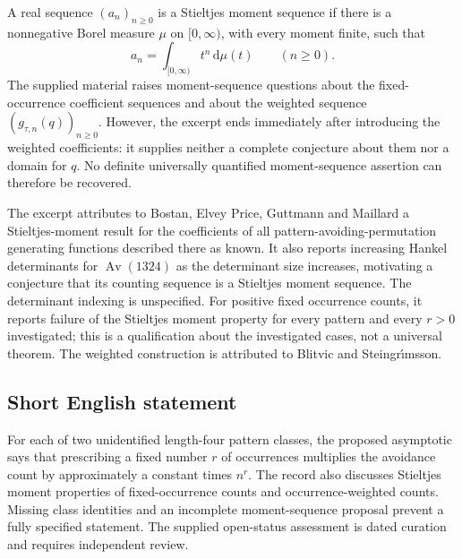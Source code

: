 \documentclass[11pt]{article}
\begin{document}
A real sequence \((a_n)_{n\ge0}\) is a Stieltjes moment sequence if there is a nonnegative Borel measure \(\mu\) on \([0,\infty)\), with every moment finite, such that
\[
a_n=\int_{[0,\infty)}t^n\,\mathrm{d}\mu(t)\qquad(n\ge0).
\]
The supplied material raises moment-sequence questions about the fixed-occurrence coefficient sequences and about the weighted sequence \((g_{\tau,n}(q))_{n\ge0}\). However, the excerpt ends immediately after introducing the weighted coefficients: it supplies neither a complete conjecture about them nor a domain for \(q\). No definite universally quantified moment-sequence assertion can therefore be recovered.

The excerpt attributes to Bostan, Elvey Price, Guttmann and Maillard a Stieltjes-moment result for the coefficients of all pattern-avoiding-permutation generating functions described there as known. It also reports increasing Hankel determinants for \(\operatorname{Av}(1324)\) as the determinant size increases, motivating a conjecture that its counting sequence is a Stieltjes moment sequence. The determinant indexing is unspecified. For positive fixed occurrence counts, it reports failure of the Stieltjes moment property for every pattern and every \(r>0\) investigated; this is a qualification about the investigated cases, not a universal theorem. The weighted construction is attributed to Blitvic and Steingr\'{\i}msson.
\subsection{Short English statement}
For each of two unidentified length-four pattern classes, the proposed asymptotic says that prescribing a fixed number \(r\) of occurrences multiplies the avoidance count by approximately a constant times \(n^r\). The record also discusses Stieltjes moment properties of fixed-occurrence counts and occurrence-weighted counts. Missing class identities and an incomplete moment-sequence proposal prevent a fully specified statement. The supplied open-status assessment is dated curation and requires independent review.
\end{document}
